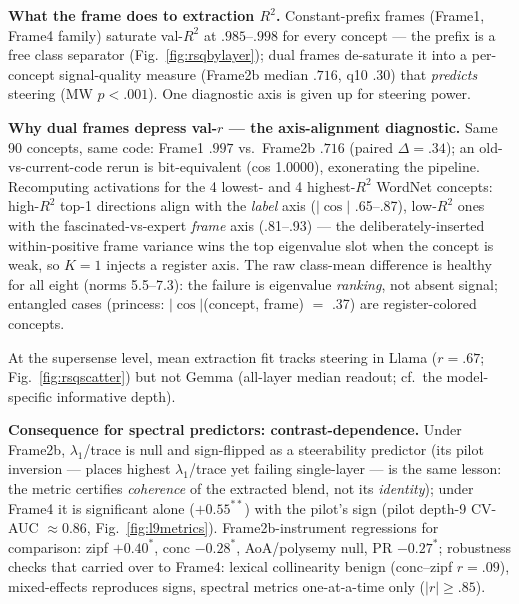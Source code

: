 \begin{outline}
\item [+] \textbf{What the frame does to extraction $R^2$.} Constant-prefix frames (Frame1, Frame4 family) saturate val-$R^2$ at $.985$--$.998$ for every concept --- the prefix is a free class separator (Fig.~\ref{fig:rsqbylayer}); dual frames de-saturate it into a per-concept signal-quality measure (Frame2b median $.716$, q10 $.30$) that \emph{predicts} steering (MW $p{<}.001$). One diagnostic axis is given up for steering power.
\item [+] \textbf{Why dual frames depress val-$r$ --- the axis-alignment diagnostic.} Same 90 concepts, same code: Frame1 $.997$ vs.\ Frame2b $.716$ (paired $\Delta{=}.34$); an old-vs-current-code rerun is bit-equivalent (cos 1.0000), exonerating the pipeline. Recomputing activations for the 4 lowest- and 4 highest-$R^2$ WordNet concepts: high-$R^2$ top-1 directions align with the \emph{label} axis ($|\cos|$ .65--.87), low-$R^2$ ones with the fascinated-vs-expert \emph{frame} axis (.81--.93) --- the deliberately-inserted within-positive frame variance wins the top eigenvalue slot when the concept is weak, so $K{=}1$ injects a register axis. The raw class-mean difference is healthy for all eight (norms 5.5--7.3): the failure is eigenvalue \emph{ranking}, not absent signal; entangled cases (princess: $|\cos|$(concept, frame) $=$ .37) are register-colored concepts.
\item [+] At the supersense level, mean extraction fit tracks steering in Llama ($r{=}.67$; Fig.~\ref{fig:rsqscatter}) but not Gemma (all-layer median readout; cf.\ the model-specific informative depth).
\item [+] \textbf{Consequence for spectral predictors: contrast-dependence.} Under Frame2b, $\lambda_1$/trace is null and sign-flipped as a steerability predictor (its pilot inversion --- places highest $\lambda_1$/trace yet failing single-layer --- is the same lesson: the metric certifies \emph{coherence} of the extracted blend, not its \emph{identity}); under Frame4 it is significant alone ($+0.55^{**}$) with the pilot's sign (pilot depth-9 CV-AUC $\approx$0.86, Fig.~\ref{fig:l9metrics}). Frame2b-instrument regressions for comparison: zipf $+0.40^{*}$, conc $-0.28^{*}$, AoA/polysemy null, PR $-0.27^{*}$; robustness checks that carried over to Frame4: lexical collinearity benign (conc--zipf $r{=}.09$), mixed-effects reproduces signs, spectral metrics one-at-a-time only ($|r|{\ge}.85$).
\end{outline}

